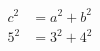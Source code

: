\begin{align}
  c^2 &= a^2 + b^2
    \label{eq:gougu-formula} \\
  5^2 &= 3^2 + 4^2
    \label{eq:gougu-example}
\end{align}
